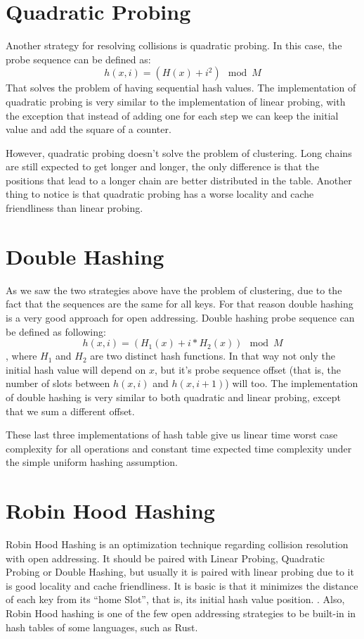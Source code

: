 \section{Quadratic Probing}

Another strategy for resolving collisions is quadratic probing. In this case, the probe sequence can be defined as:
\[ h(x, i) = (H(x) + i^2) \mod M \]
That solves the problem of having sequential hash values. The implementation of quadratic probing is very similar to the implementation of linear probing, with the exception that instead of adding one for each step we can keep the initial value and add the square of a counter.

However, quadratic probing doesn't solve the problem of clustering. Long chains are still expected to get longer and longer, the only difference is that the positions that lead to a longer chain are better distributed in the table. Another thing to notice is that quadratic probing has a worse locality and cache friendliness than linear probing. 

\section{Double Hashing}

As we saw the two strategies above have the problem of clustering, due to the fact that the sequences are the same for all keys. For that reason double hashing is a very good approach for open addressing. Double hashing probe sequence can be defined as following:
\[ h(x, i) = (H_1(x) + i * H_2(x)) \mod M \],
where \( H_1 \) and \( H_2 \) are two distinct hash functions. In that way not only the initial hash value will depend on \( x \), but it's probe sequence offset (that is, the number of slots between \(h(x, i) \) and \(h(x, i + 1) \)) will too. The implementation of double hashing is very similar to both quadratic and linear probing, except that we sum a different offset.

These last three implementations of hash table give us linear time worst case complexity for all operations and constant time expected time complexity under the simple uniform hashing assumption.

\section{Robin Hood Hashing}

Robin Hood Hashing is an optimization technique regarding collision resolution with open addressing. It should be paired with Linear Probing, Quadratic Probing or Double Hashing, but usually it is paired with linear probing due to it is good locality and cache friendliness. It is basic is that it minimizes the distance of each key from its ``home Slot'', that is, its initial hash value position. \citep{RobinHoodHashing}. Also, Robin Hood hashing is one of the few open addressing strategies to be built-in in hash tables of some languages, such as Rust.

